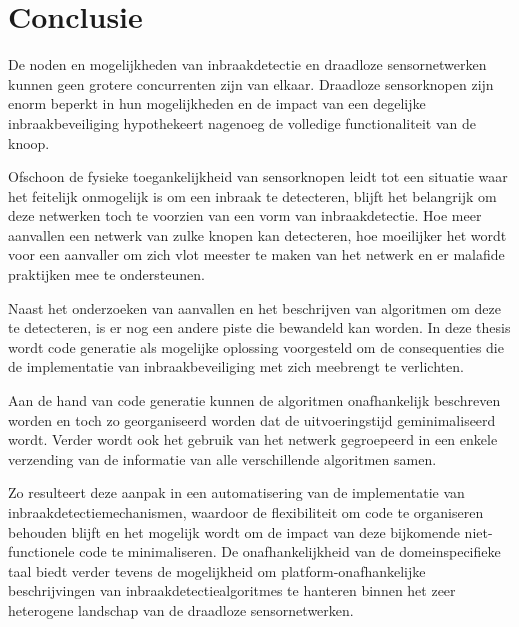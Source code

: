 \documentclass[12pt,a4paper,draft]{article}
\begin{document}
\section*{Conclusie}

De noden en mogelijkheden van inbraakdetectie en draadloze sensornetwerken
kunnen geen grotere concurrenten zijn van elkaar. Draadloze sensorknopen zijn
enorm beperkt in hun mogelijkheden en de impact van een degelijke
inbraakbeveiliging hypothekeert nagenoeg de volledige functionaliteit van de
knoop.

Ofschoon de fysieke toegankelijkheid van sensorknopen leidt tot een situatie
waar het feitelijk onmogelijk is om een inbraak te detecteren, blijft het
belangrijk om deze netwerken toch te voorzien van een vorm van inbraakdetectie.
Hoe meer aanvallen een netwerk van zulke knopen kan detecteren, hoe moeilijker
het wordt voor een aanvaller om zich vlot meester te maken van het netwerk en
er malafide praktijken mee te ondersteunen.

Naast het onderzoeken van aanvallen en het beschrijven van algoritmen om deze
te detecteren, is er nog een andere piste die bewandeld kan worden. In deze
thesis wordt code generatie als mogelijke oplossing voorgesteld om de
consequenties die de implementatie van inbraakbeveiliging met zich meebrengt te
verlichten.

Aan de hand van code generatie kunnen de algoritmen onafhankelijk beschreven
worden en toch zo georganiseerd worden dat de uitvoeringstijd geminimaliseerd
wordt. Verder wordt ook het gebruik van het netwerk gegroepeerd in een enkele
verzending van de informatie van alle verschillende algoritmen samen.

Zo resulteert deze aanpak in een automatisering van de implementatie van
inbraakdetectiemechanismen, waardoor de flexibiliteit om code te organiseren
behouden blijft en het mogelijk wordt om de impact van deze bijkomende
niet-functionele code te minimaliseren. De onafhankelijkheid van de
domeinspecifieke taal biedt verder tevens de mogelijkheid om
platform-onafhankelijke beschrijvingen van inbraakdetectiealgoritmes te
hanteren binnen het zeer heterogene landschap van de draadloze sensornetwerken.
\end{document}
